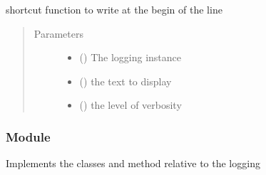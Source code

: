 \documentclass[a4paper,10pt,english]{sphinxmanual}
\begin{document}
\begin{fulllineitems}
\label{\detokenize{commands/apidoc/src:src.fork.write_back}}
shortcut function to write at the begin of the line
\begin{quote}\begin{description}
\item[{Parameters}] \leavevmode\begin{itemize}
\item {} 
 () \textendash{} The logging instance

\item {} 
 () \textendash{} the text to display

\item {} 
 () \textendash{} the level of verbosity

\end{itemize}

\end{description}\end{quote}

\end{fulllineitems}



\subsubsection{ Module}
\label{\detokenize{commands/apidoc/src:logger-module}}\label{\detokenize{commands/apidoc/src:module-src.logger}}
Implements the classes and method relative to the logging
\end{document}
